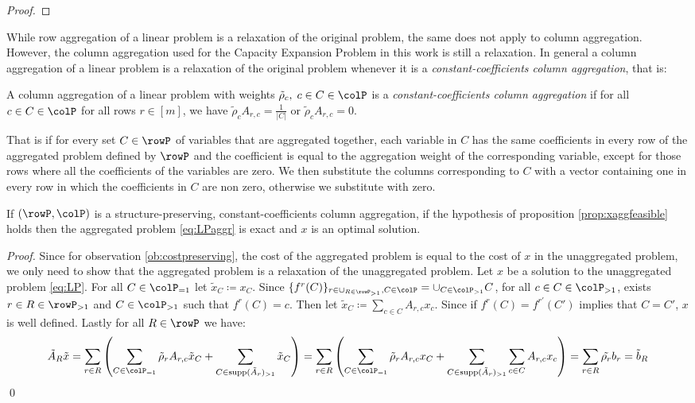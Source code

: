 {\begin{proof}
\end{proof}


While row aggregation of a linear problem is a relaxation of the original problem, the same does not apply to column aggregation. However, the column aggregation used for the  Capacity Expansion Problem in this work is still a relaxation. In general a column aggregation of a linear problem is a relaxation of the original problem whenever it is a \emph{constant-coefficients column aggregation}, that is:
\begin{definition}
  A column aggregation  of a linear problem with weights \(\tilde{\rho}_c,\; c \in C \in \colP \) is a \emph{constant-coefficients column aggregation}  if for all \(c \in C \in \colP\) for all rows \(r \in [m]\), we have \(\tilde{\rho}_cA_{r,c} = \frac{1}{|C|}\) or  \(\tilde{\rho}_cA_{r,c} = 0\).  
\end{definition}

That is if for every set \( C \in \rowP \) of variables that are aggregated together, each variable in \( C \) has the same coefficients in every row of the aggregated problem defined by \( \rowP \) and the coefficient is equal to the aggregation weight of the corresponding variable, except for those rows where all the coefficients of the variables are zero.
We then substitute the columns corresponding to \( C \) with a vector containing one in every row in which the coefficients in \(C\) are non zero, otherwise we substitute with zero.

\begin{proposition}
If \((\rowP,\colP)\) is a structure-preserving, constant-coefficients column aggregation,
if the hypothesis of proposition \ref{prop:xaggfeasible} holds then the aggregated problem \eqref{eq:LPaggr} is exact and \(x\) is an optimal solution.
\end{proposition}

\begin{proof}
  Since for observation \ref{ob:costpreserving}, the cost of the aggregated problem is equal to the cost of \(x\) in the unaggregated problem, we only need to show that the aggregated problem is a relaxation of the unaggregated problem.
  Let \(x\) be a solution to the unaggregated problem \eqref{eq:LP}. For all \(C \in \colP_{=1}\) let \(\tilde{x}_C \coloneqq x_C\).
  Since  \(\{f^r(C)\}_{r \in \cup_{R\in \rowP_{>1}}, C \in \colP} = \cup_{C \in \colP_{>1}}C\), for all \(c \in C \in \colP_{>1}\), exists \(r \in R \in \rowP_{>1}\) and \(C \in \colP_{>1}\) such that \(f^r(C) = c\).
  Then let \(\tilde{x}_C \coloneqq \sum_{c \in C}A_{r,c}x_c\). Since if \(f^{r}(C)= f^{r'}(C')\) implies that \(C=C'\), \(x\) is well defined.
  Lastly for all \(R \in \rowP\) we have:
  \[\tilde{A}_R\tilde{x} = \sum_{r \in R} \left( \sum_{C \in \colP_{=1}}\tilde{\rho}_rA_{r,c}\tilde{x}_C + \sum_{C\in \supp(\tilde{A}_r)_{>1}} \tilde{x}_C \right) = \sum_{r \in R} \left( \sum_{C \in \colP_{=1}}\tilde{\rho}_rA_{r,c}x_C + \sum_{C\in \supp(\tilde{A}_r)_{>1}} \sum_{c \in C}A_{r,c}x_c \right) = \sum_{r \in R} \tilde{\rho_r} b_r = \tilde{b}_R 
  \]
  \qed
\end{proof}
}

